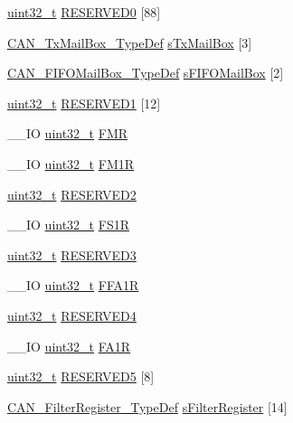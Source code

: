 \begin{DoxyCompactItemize}
\hyperlink{stdint_8h_a435d1572bf3f880d55459d9805097f62}{uint32\-\_\-t} \hyperlink{struct_c_a_n___type_def_af394c92193f1e52feaa7a27e090374ed}{R\-E\-S\-E\-R\-V\-E\-D0} \mbox{[}88\mbox{]}
\item 
\hyperlink{struct_c_a_n___tx_mail_box___type_def}{C\-A\-N\-\_\-\-Tx\-Mail\-Box\-\_\-\-Type\-Def} \hyperlink{struct_c_a_n___type_def_ab78f764584ec276cd36960d4f4fcdc1a}{s\-Tx\-Mail\-Box} \mbox{[}3\mbox{]}
\item 
\hyperlink{struct_c_a_n___f_i_f_o_mail_box___type_def}{C\-A\-N\-\_\-\-F\-I\-F\-O\-Mail\-Box\-\_\-\-Type\-Def} \hyperlink{struct_c_a_n___type_def_a90ff90723c0ec4ae8a7028d4f3b024f4}{s\-F\-I\-F\-O\-Mail\-Box} \mbox{[}2\mbox{]}
\item 
\hyperlink{stdint_8h_a435d1572bf3f880d55459d9805097f62}{uint32\-\_\-t} \hyperlink{struct_c_a_n___type_def_abd4c34405c765b5bd5fe38bbeb7569b6}{R\-E\-S\-E\-R\-V\-E\-D1} \mbox{[}12\mbox{]}
\item 
\-\_\-\-\_\-\-I\-O \hyperlink{stdint_8h_a435d1572bf3f880d55459d9805097f62}{uint32\-\_\-t} \hyperlink{struct_c_a_n___type_def_a1a6a0f78ca703a63bb0a6b6f231f612f}{F\-M\-R}
\item 
\-\_\-\-\_\-\-I\-O \hyperlink{stdint_8h_a435d1572bf3f880d55459d9805097f62}{uint32\-\_\-t} \hyperlink{struct_c_a_n___type_def_aefe6a26ee25947b7eb5be9d485f4d3b0}{F\-M1\-R}
\item 
\hyperlink{stdint_8h_a435d1572bf3f880d55459d9805097f62}{uint32\-\_\-t} \hyperlink{struct_c_a_n___type_def_ab29069c9fd10eeec47414abd8d06822f}{R\-E\-S\-E\-R\-V\-E\-D2}
\item 
\-\_\-\-\_\-\-I\-O \hyperlink{stdint_8h_a435d1572bf3f880d55459d9805097f62}{uint32\-\_\-t} \hyperlink{struct_c_a_n___type_def_ac6296402924b37966c67ccf14a381976}{F\-S1\-R}
\item 
\hyperlink{stdint_8h_a435d1572bf3f880d55459d9805097f62}{uint32\-\_\-t} \hyperlink{struct_c_a_n___type_def_af730af32307f845895465e8ead57d20c}{R\-E\-S\-E\-R\-V\-E\-D3}
\item 
\-\_\-\-\_\-\-I\-O \hyperlink{stdint_8h_a435d1572bf3f880d55459d9805097f62}{uint32\-\_\-t} \hyperlink{struct_c_a_n___type_def_ae2decd14b26f851e00a31b42d15293ce}{F\-F\-A1\-R}
\item 
\hyperlink{stdint_8h_a435d1572bf3f880d55459d9805097f62}{uint32\-\_\-t} \hyperlink{struct_c_a_n___type_def_a51c408c7c352b8080f0c6d42bf811d43}{R\-E\-S\-E\-R\-V\-E\-D4}
\item 
\-\_\-\-\_\-\-I\-O \hyperlink{stdint_8h_a435d1572bf3f880d55459d9805097f62}{uint32\-\_\-t} \hyperlink{struct_c_a_n___type_def_ab57a3a6c337a8c6c7cb39d0cefc2459a}{F\-A1\-R}
\item 
\hyperlink{stdint_8h_a435d1572bf3f880d55459d9805097f62}{uint32\-\_\-t} \hyperlink{struct_c_a_n___type_def_a05b74b369ea3d9489caa4427c034c2a3}{R\-E\-S\-E\-R\-V\-E\-D5} \mbox{[}8\mbox{]}
\item 
\hyperlink{struct_c_a_n___filter_register___type_def}{C\-A\-N\-\_\-\-Filter\-Register\-\_\-\-Type\-Def} \hyperlink{struct_c_a_n___type_def_aaf5116cf475c48e9f4db550100faa2d9}{s\-Filter\-Register} \mbox{[}14\mbox{]}
\end{DoxyCompactItemize}


